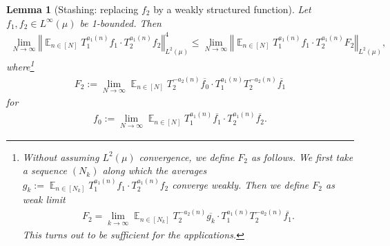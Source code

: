 \documentclass[11pt]{amsart}
\newtheorem{lemma}{Lemma}[section]
\theoremstyle{definition}
\DeclareMathOperator*{\E}{\mathbb{E}}
\newcommand{\norm}[1]{\left\Vert #1\right\Vert}
\newcommand{\1}{{\mathbf{1}}}
\begin{document}
\begin{lemma}[Stashing: replacing $f_2$ by a weakly structured function]\label{L: stashing in degree lowering}
    Let $f_1, f_2\in L^\infty(\mu)$ be 1-bounded. 
    Then
    \begin{align*}
        \lim_{N\to\infty}\norm{\E_{n\in[N]}T_1^{a_1(n)}f_1 \cdot T_2^{a_1(n)}f_2}_{L^2(\mu)}^4\leq \lim_{N\to\infty}\norm{\E_{n\in[N]}T_1^{a_1(n)}f_1 \cdot T_2^{a_1(n)}F_2}_{L^2(\mu)},
    \end{align*}
    where\footnote{Without assuming $L^2(\mu)$ convergence, we define $F_2$ as follows. We first take a sequence $(N_k)$ along which the averages $g_k:=\E_{n\in[N_k]}T_1^{a_1(n)}f_1 \cdot T_2^{a_1(n)}f_2$ converge weakly. Then we define $F_2$ as \emph{weak} limit
    \begin{align*}
                   F_2 = \lim_{k\to\infty}\E_{n\in[N_k]}T_2^{-a_2(n)}\overline{g_k}\cdot T_1^{a_1(n)}T_2^{-a_2(n)}\overline{f_1}. 
    \end{align*}
    This turns out to be sufficient for the applications.
    }
    \begin{align}\label{E: structured}
           F_2 := \lim_{N\to\infty}\E_{n\in[N]}T_2^{-a_2(n)}\overline{f_0}\cdot T_1^{a_1(n)}T_2^{-a_2(n)}\overline{f_1} 
    \end{align}
    for %
    \begin{align*}
        f_0:= \lim_{N\to\infty}\E_{n\in[N]}T_1^{a_1(n)}\overline{f_1} \cdot T_2^{a_1(n)}\overline{f_2}.
    \end{align*}
\end{lemma}
\end{document}
